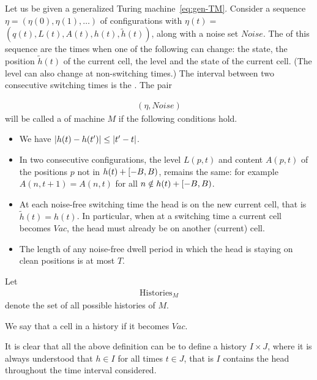 \documentclass[12pt]{memoir}
\newcommand{\authnote}[3]
{\text{{ \textcolor{#3}{\( \langle\hspace{-0.2em}\langle \)\textsf{\footnotesize #1: #2}\( \rangle\hspace{-0.2em}\rangle \)}}}}
\newcommand{\authnote}[2]{}
\newcommand{\Pnote}[1]{{\authnote{P}{#1}{cyan}}}
\renewcommand{\le}{\leq}
\def\B{B}
\newcommand{\Vacant}{\mathit{Vac}}
\newcommand{\h}{h}
\newcommand{\hc}{\tilde h}
\newcommand{\Noise}{\mathit{Noise}}
\newcommand{\Tu}{T}
\newcommand{\Histories}{\mathrm{Histories}}
\begin{document}
\begin{definition}[History]\label{def:history}
  \begin{sloppypar}
    Let us be given a generalized Turing machine~\eqref{eq:gen-TM}.
    Consider a sequence \( \eta = (\eta(0), \eta(1), \dots) \) of configurations with
    \( \eta(t) = \) \( (q(t), L(t), A(t), \h(t), \hc(t)) \), along with a noise set \( \Noise \).
    The  of this sequence 
are the times when one of the following can change:
the state, the position \( \hc(t) \) of the current cell, the level and the state of the current cell.
(The level can also change at non-switching times.)
The interval between two consecutive switching times is the .
The pair
      \end{sloppypar}
    \begin{align*}
       (\eta,\Noise)
    \end{align*}
    will be called a  of machine \( M \) if the following conditions hold.
        \begin{itemize}
            \item We have \( \abs{\h(t) - \h(t')} \le \abs{t' - t} \).

            \item In two consecutive configurations, the level \( L(p,t) \) and content \( A(p,t) \) 
              of the positions \( p \)
              not in \( \h(t) + \lint{-\B}{\B} \), remains the same: for example
                  \( A(n,t+1) = A(n,t) \) for all \( n \notin \h(t) + \lint{-\B}{\B} \).
\Pnote{Maybe for the level we will use \( \lint{-2\B}{2\B} \).}
            \item At each noise-free switching time the head is on the new current cell, that is
\( \hc(t)=\h(t) \).
In particular, when at a switching time a current cell becomes
\( \Vacant \), the head must already be on another (current) cell.

            \item The length of any noise-free 
dwell period in which the head is staying on clean positions is at most \( \Tu \).

        \end{itemize}
    Let
        \begin{align*}
            \Histories_{M}
        \end{align*}
    denote the set of all possible histories of \( M \).

We say that a cell  in a history if it becomes \( \Vacant \).

It is clear that all the above definition can be  to define a history
 \( I\times J \), 
where it is always understood that \( \h\in I \) for all times \( t\in J \),
that is \( I \) contains the head throughout the time interval considered.

\end{definition}
\end{document}
